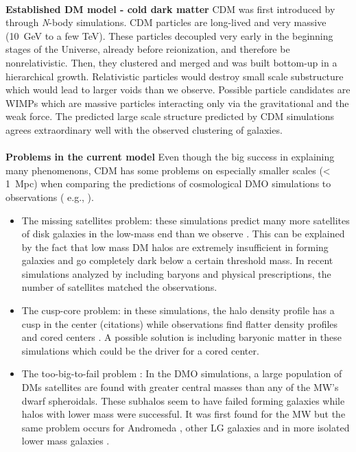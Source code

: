\\\textbf{Established \ac{DM} model - cold dark matter}
\ac{CDM} was first introduced by \cite{Davis....CDM...1985} through \textit{N}-body simulations. \ac{CDM} particles are long-lived and very massive (\SI{10}{GeV} to a few TeV). These particles decoupled very early in the beginning stages of the Universe, already before reionization, and therefore be nonrelativistic. Then, they clustered and merged and was built bottom-up in a hierarchical growth.  Relativistic particles would destroy small scale substructure which would lead to larger voids than we observe. Possible particle candidates are \ac{WIMPs} which are massive particles interacting only via the gravitational and the weak force. The predicted large scale structure predicted by \ac{CDM} simulations agrees extraordinary well with the observed clustering of galaxies. \\
\\\textbf{Problems in the current model}
Even though the big success in explaining many phenomenons, \ac{CDM} has some problems on especially smaller scales (< \SI{1}{Mpc}) when comparing the predictions of cosmological \ac{DMO} simulations to observations ( e.g., \cite{Bullock...LCDMprobs...2017}). 
\begin{itemize}
    \item The missing satellites problem: these simulations predict many more satellites of disk galaxies in the low-mass end than we observe \citep{Klypin...missingsatellites...1999, Moore...missingsatellites..1999}. This can be explained by the fact that low mass \ac{DM} halos are extremely insufficient in forming galaxies and go completely dark below a certain threshold mass. In recent simulations analyzed by \citet{Sawala...noCDMproblems...2016} including baryons and physical prescriptions, the number of satellites matched the observations.
    \item The cusp-core problem: in these simulations, the halo density profile has a cusp in the center (citations) while observations find flatter density profiles and cored centers \citep{Flores...cuspcoreprob...1994, Moore...cuspcoreprob...1994}. A possible solution is including baryonic matter in these simulations which could be the driver for a cored center. 
    \item The too-big-to-fail problem \citep{Boylan...toobigtoofail...2011}: In the \ac{DMO} simulations, a large population of \acp{DM} satellites are found with greater central masses than any of the \ac{MW}'s dwarf spheroidals. These subhalos seem to have failed forming galaxies while halos with lower mass were successful. It was first found for the \ac{MW} but the same problem occurs for Andromeda \citep{Tollerud...M31tbtf...2014}, other \ac{LG} galaxies \citep{Kirby...LGtbtf...2014} and in more isolated lower mass galaxies \citep{Ferrero...DGtbtf...2012, Papastergis...DGtbtf...2015, Papastergis...DGtbtf...2016}.
    \iffalse\item The planes of satellites problem: \fi
\end{itemize}


